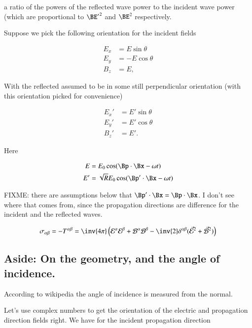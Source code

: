 a ratio of the powers of the reflected wave power to the incident wave power (which are proportional to ${\BE'}^2$ and ${\BE}^2$ respectively.

Suppose we pick the following orientation for the incident fields

\begin{align}\label{eqn:relativisticElectrodynamicsT9:70}
E_x &= E \sin\theta \\
E_y &= -E \cos\theta \\
B_z &= E ,
\end{align}

With the reflected assumed to be in some still perpendicular orientation (with this orientation picked for convenience)

\begin{align}\label{eqn:relativisticElectrodynamicsT9:90}
E_x' &= E' \sin\theta \\
E_y' &= E' \cos\theta \\
B_z' &= E'.
\end{align}

Here

\begin{align}\label{eqn:relativisticElectrodynamicsT9:110}
E &= E_0 \cos(\Bp \cdot \Bx - \omega t) \\
E' &= \sqrt{R} E_0 \cos(\Bp' \cdot \Bx - \omega t)
\end{align}

FIXME: there are assumptions below that $\Bp' \cdot \Bx = \Bp \cdot \Bx$.  I don't see where that comes from, since the propagation directions are difference for the incident and the reflected waves.

\begin{equation}\label{eqn:relativisticElectrodynamicsT9:130}
\sigma_{\alpha\beta} = -T^{\alpha\beta} = \inv{4\pi} \left(
\mathcal{E}^\alpha
\mathcal{E}^\beta
+\mathcal{B}^\alpha
\mathcal{B}^\beta
- \inv{2} \delta^{\alpha\beta} ( \vec{\mathcal{E}}^2 + \vec{\mathcal{B}}^2 )
\right)
\end{equation}

\subsection{Aside: On the geometry, and the angle of incidence.}

According to wikipedia \cite{wiki:angleOfIncidence} the angle of incidence is measured from the normal.

Let's use complex numbers to get the orientation of the electric and propagation direction fields right.  We have for the incident propagation direction


